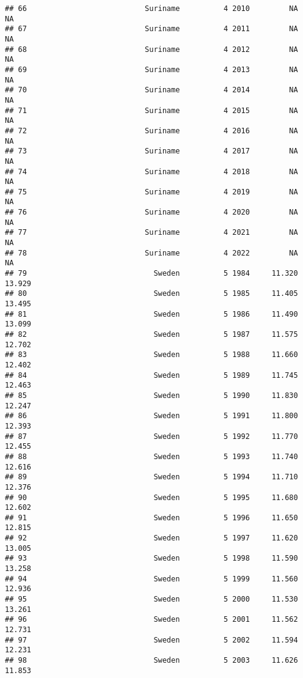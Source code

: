 \documentclass[
]{article}
\begin{document}
\begin{verbatim}
## 66                           Suriname          4 2010         NA         NA
## 67                           Suriname          4 2011         NA         NA
## 68                           Suriname          4 2012         NA         NA
## 69                           Suriname          4 2013         NA         NA
## 70                           Suriname          4 2014         NA         NA
## 71                           Suriname          4 2015         NA         NA
## 72                           Suriname          4 2016         NA         NA
## 73                           Suriname          4 2017         NA         NA
## 74                           Suriname          4 2018         NA         NA
## 75                           Suriname          4 2019         NA         NA
## 76                           Suriname          4 2020         NA         NA
## 77                           Suriname          4 2021         NA         NA
## 78                           Suriname          4 2022         NA         NA
## 79                             Sweden          5 1984     11.320     13.929
## 80                             Sweden          5 1985     11.405     13.495
## 81                             Sweden          5 1986     11.490     13.099
## 82                             Sweden          5 1987     11.575     12.702
## 83                             Sweden          5 1988     11.660     12.402
## 84                             Sweden          5 1989     11.745     12.463
## 85                             Sweden          5 1990     11.830     12.247
## 86                             Sweden          5 1991     11.800     12.393
## 87                             Sweden          5 1992     11.770     12.455
## 88                             Sweden          5 1993     11.740     12.616
## 89                             Sweden          5 1994     11.710     12.376
## 90                             Sweden          5 1995     11.680     12.602
## 91                             Sweden          5 1996     11.650     12.815
## 92                             Sweden          5 1997     11.620     13.005
## 93                             Sweden          5 1998     11.590     13.258
## 94                             Sweden          5 1999     11.560     12.936
## 95                             Sweden          5 2000     11.530     13.261
## 96                             Sweden          5 2001     11.562     12.731
## 97                             Sweden          5 2002     11.594     12.231
## 98                             Sweden          5 2003     11.626     11.853

\end{verbatim}
\end{document}
